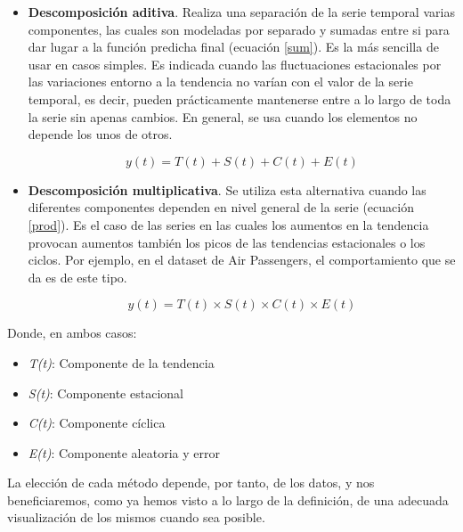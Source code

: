 \begin{itemize}
    \item \textbf{Descomposición aditiva}. Realiza una separación de la serie temporal varias componentes, las cuales son modeladas por separado y sumadas entre si para dar lugar a la función predicha final (ecuación \ref{sum}). Es la más sencilla de usar en casos simples. Es indicada cuando las fluctuaciones estacionales por las variaciones entorno a la tendencia no varían con el valor de la serie temporal, es decir, pueden prácticamente mantenerse entre a lo largo de toda la serie sin apenas cambios. En general, se usa cuando los elementos no depende los unos de otros.

    \begin{equation}
        y(t) = T(t) + S(t) + C(t) + E(t)
        \label{sum}
    \end{equation}

    \item \textbf{Descomposición multiplicativa}. Se utiliza esta alternativa cuando las diferentes componentes dependen en nivel general de la serie (ecuación \ref{prod}). Es el caso de las series en las cuales los aumentos en la tendencia provocan aumentos también los picos de las tendencias estacionales o los ciclos. Por ejemplo, en el dataset de Air Passengers, el comportamiento que se da es de este tipo.

    \begin{equation}
        y(t) = T(t) \times S(t) \times C(t) \times E(t)
        \label{prod}
    \end{equation}

\end{itemize}

Donde, en ambos casos:

\begin{itemize}
    \item \textit{T(t)}: Componente de la tendencia

    \item \textit{S(t)}: Componente estacional

    \item \textit{C(t)}: Componente cíclica

    \item \textit{E(t)}: Componente aleatoria y error
\end{itemize}

La elección de cada método depende, por tanto, de los datos, y nos beneficiaremos, como ya hemos visto a lo largo de la definición, de una adecuada visualización de los mismos cuando sea posible.

